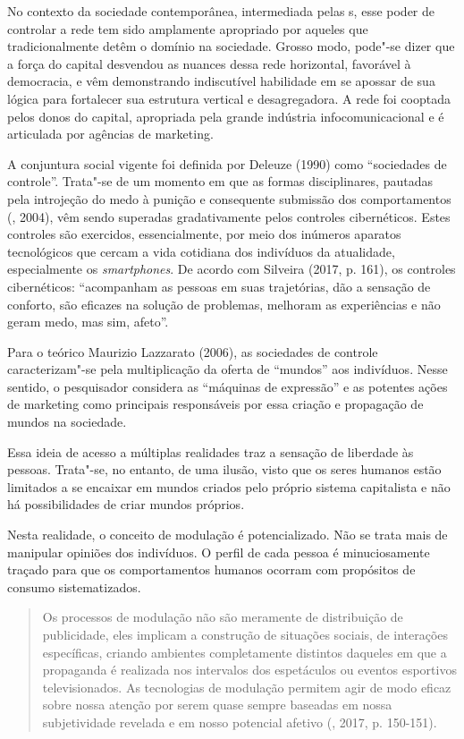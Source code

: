 No contexto da sociedade contemporânea, intermediada pelas s, esse
poder de controlar a rede tem sido amplamente apropriado por aqueles que
tradicionalmente detêm o domínio na sociedade. Grosso modo, pode"-se
dizer que a força do capital desvendou as nuances dessa rede horizontal,
favorável à democracia, e vêm demonstrando indiscutível habilidade em se
apossar de sua lógica para fortalecer sua estrutura vertical e
desagregadora. A rede foi cooptada pelos donos do capital, apropriada
pela grande indústria infocomunicacional e é articulada por agências de
marketing.

A conjuntura social vigente foi definida por Deleuze (1990) como
``sociedades de controle''. Trata"-se de um momento em que as formas
disciplinares, pautadas pela introjeção do medo à punição e consequente
submissão dos comportamentos (, 2004), vêm sendo superadas
gradativamente pelos controles cibernéticos. Estes controles são
exercidos, essencialmente, por meio dos inúmeros aparatos tecnológicos
que cercam a vida cotidiana dos indivíduos da atualidade, especialmente
os \emph{smartphones}. De acordo com Silveira (2017, p. 161), os
controles cibernéticos: ``acompanham as pessoas em suas trajetórias, dão
a sensação de conforto, são eficazes na solução de problemas, melhoram
as experiências e não geram medo, mas sim, afeto''.

Para o teórico Maurizio Lazzarato (2006), as sociedades de controle
caracterizam"-se pela multiplicação da oferta de ``mundos'' aos
indivíduos. Nesse sentido, o pesquisador considera as ``máquinas de
expressão'' e as potentes ações de marketing como principais
responsáveis por essa criação e propagação de mundos na sociedade.

Essa ideia de acesso a múltiplas realidades traz a sensação de liberdade
às pessoas. Trata"-se, no entanto, de uma ilusão, visto que os seres
humanos estão limitados a se encaixar em mundos criados pelo próprio
sistema capitalista e não há possibilidades de criar mundos próprios.

Nesta realidade, o conceito de modulação é potencializado. Não se trata
mais de manipular opiniões dos indivíduos. O perfil de cada pessoa é
minuciosamente traçado para que os comportamentos humanos ocorram com
propósitos de consumo sistematizados.

\begin{quote}
Os processos de modulação não são meramente de distribuição de
publicidade, eles implicam a construção de situações sociais, de
interações específicas, criando ambientes completamente distintos
daqueles em que a propaganda é realizada nos intervalos dos espetáculos
ou eventos esportivos televisionados. As tecnologias de modulação
permitem agir de modo eficaz sobre nossa atenção por serem quase sempre
baseadas em nossa subjetividade revelada e em nosso potencial afetivo (, 2017, p. 150-151).
\end{quote}

